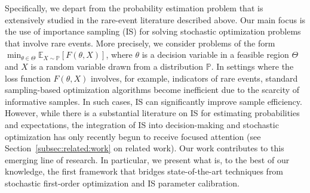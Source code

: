 \documentclass[11pt,a4paper]{article}
\theoremstyle{definition}
\begin{document}
Specifically, we depart from the probability estimation problem that is extensively studied in the rare-event literature described above. Our main focus is the use of importance sampling (IS) for solving stochastic optimization problems that involve rare events. More precisely, we consider problems of the form $\min_{\theta\in\Theta} \mathbb E_{X \sim \mathbb P}\left[ F(\theta, X) \right]$, where $\theta$ is a decision variable in a feasible region $\Theta$ and $X$ is a random variable drawn from a distribution $\mathbb P$. In settings where the loss function $F(\theta, X)$ involves, for example, indicators of rare events, standard sampling-based optimization algorithms become inefficient due to the scarcity of informative samples.
In such cases, IS can significantly improve sample efficiency. However, while there is a substantial literature on IS for estimating probabilities and expectations, the integration of IS into decision-making and stochastic optimization has only recently begun to receive focused attention (see Section~\ref{subsec:related:work} on related work). Our work contributes to this emerging line of research. In particular, we present what is, to the best of our knowledge, the first framework that bridges state-of-the-art techniques from stochastic first-order optimization and IS parameter calibration. 
\end{document}
